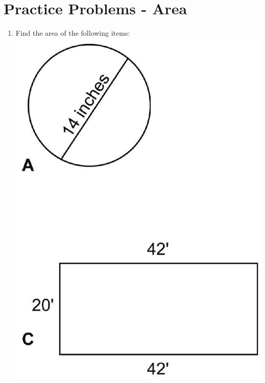 \documentclass[10pt]{article}
\begin{document}
\section{Practice Problems - Area}
\begin{enumerate}
  \item Find the area of the following items:\\

\includegraphics[max width=\textwidth]{2022_09_11_72dbedc910e6e984560cg-28}
\end{enumerate}
\end{document}
